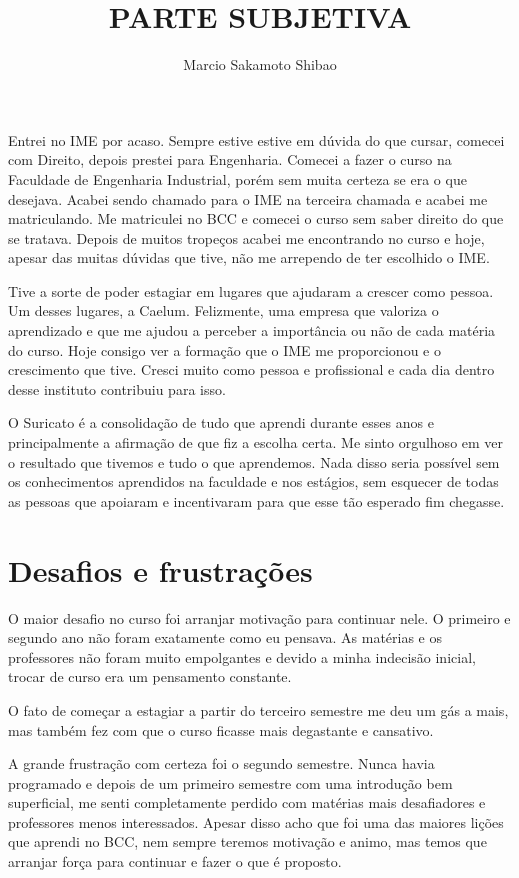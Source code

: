 \documentclass[titlepage,a4paper]{article}
\title{PARTE SUBJETIVA}
\author{Marcio Sakamoto Shibao}
\begin{document}
\maketitle
Entrei no IME por acaso. Sempre estive estive em dúvida do que cursar, comecei com Direito, depois prestei para Engenharia. Comecei a fazer o curso na Faculdade de Engenharia Industrial, porém sem muita certeza se era o que desejava. Acabei sendo chamado para o IME na terceira chamada e acabei me matriculando. Me matriculei no BCC e comecei o curso sem saber direito do que se tratava. Depois de muitos tropeços acabei me encontrando no curso e hoje, apesar das muitas dúvidas que tive, não me arrependo de ter escolhido o IME.

Tive a sorte de poder estagiar em lugares que ajudaram a crescer como pessoa. Um desses lugares, a Caelum. Felizmente, uma empresa que valoriza o aprendizado e que me ajudou a perceber a importância ou não de cada matéria do curso. Hoje consigo ver a formação que o IME me proporcionou e o crescimento que tive. Cresci muito como pessoa e profissional e cada dia dentro desse instituto contribuiu para isso.

O Suricato é a consolidação de tudo que aprendi durante esses anos e principalmente a afirmação de que fiz a escolha certa. Me sinto orgulhoso em ver o resultado que tivemos e tudo o que aprendemos. Nada disso seria possível sem os conhecimentos aprendidos na faculdade e nos estágios, sem esquecer de todas as pessoas que apoiaram e incentivaram para que esse tão esperado fim chegasse.
\section{Desafios e frustrações}

O maior desafio no curso foi arranjar motivação para continuar nele. O primeiro e segundo ano não foram exatamente como eu pensava. As matérias e os professores não foram muito empolgantes e devido a minha indecisão inicial, trocar de curso era um pensamento constante.

O fato de começar a estagiar a partir do terceiro semestre me deu um gás a mais, mas também fez com que o curso ficasse mais degastante e cansativo.

A grande frustração com certeza foi o segundo semestre. Nunca havia programado e depois de um primeiro semestre com uma introdução bem superficial, me senti completamente perdido com matérias mais desafiadores e professores menos interessados. Apesar disso acho que foi uma das maiores lições que aprendi no BCC, nem sempre teremos motivação e animo, mas temos que arranjar força para continuar e fazer o que é proposto.
\end{document}
